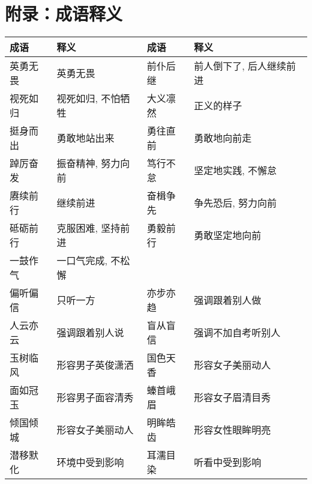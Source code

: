 \section{附录：成语释义}
\label{fst:appendix}

\begin{longtable}{|p{}|p{}|p{}|p{}|}
    \hline
    \textbf{成语} & \textbf{释义}                        & \textbf{成语} & \textbf{释义}               \\
    \hline
    英勇无畏        & 英勇无畏                               & 前仆后继        & 前人倒下了, 后人继续前进             \\
    \hline
    视死如归        & 视死如归, 不怕牺牲                         & 大义凛然        & 正义的样子                     \\
    \hline
    挺身而出        & 勇敢地站出来                             & 勇往直前        & 勇敢地向前走                    \\
    \hline
    踔厉奋发        & 振奋精神, 努力向前                         & 笃行不怠        & 坚定地实践, 不懈怠                \\
    \hline
    赓续前行        & 继续前进                               & 奋楫争先        & 争先恐后, 努力向前                \\
    \hline
    砥砺前行        & 克服困难, 坚持前进                         & 勇毅前行        & 勇敢坚定地向前                   \\
    \hline
    一鼓作气        & 一口气完成, 不松懈                         &             &                           \\
    \hline
    偏听偏信        & 只听一方                               & 亦步亦趋        & 强调跟着别人做                   \\
    \hline
    人云亦云        & 强调跟着别人说                            & 盲从盲信        & 强调不加自考听别人                 \\
    \hline
    玉树临风        & 形容男子英俊潇洒                           & 国色天香        & 形容女子美丽动人                  \\
    \hline
    面如冠玉        & 形容男子面容清秀                           & 螓首峨眉        & 形容女子眉清目秀                  \\
    \hline
    倾国倾城        & 形容女子美丽动人                           & 明眸皓齿        & 形容女性眼眸明亮                  \\
    \hline
    潜移默化        & 环境中受到影响                            & 耳濡目染        & 听看中受到影响                   \\

\end{longtable}
